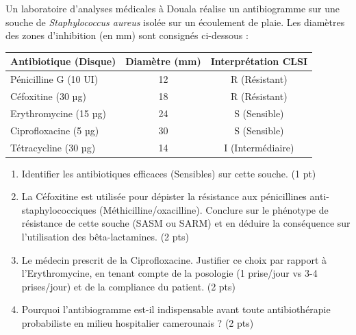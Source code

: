\documentclass[11pt]{article}
\begin{document}
\begin{exercice}
Un laboratoire d'analyses médicales à Douala réalise un antibiogramme sur une souche de \textit{Staphylococcus aureus} isolée sur un écoulement de plaie. Les diamètres des zones d'inhibition (en mm) sont consignés ci-dessous :

\begin{center}
\begin{tabular}{|l|c|c|}
\hline
\textbf{Antibiotique (Disque)} & \textbf{Diamètre (mm)} & \textbf{Interprétation CLSI} \\
\hline
Pénicilline G (10 UI) & 12 & R (Résistant) \\
\hline
Céfoxitine (30 µg) & 18 & R (Résistant) \\
\hline
Erythromycine (15 µg) & 24 & S (Sensible) \\
\hline
Ciprofloxacine (5 µg) & 30 & S (Sensible) \\
\hline
Tétracycline (30 µg) & 14 & I (Intermédiaire) \\
\hline
\end{tabular}
\end{center}

\begin{enumerate}
    \item Identifier les antibiotiques efficaces (Sensibles) sur cette souche. (1 pt)
    \item La Céfoxitine est utilisée pour dépister la résistance aux pénicillines anti-staphylococciques (Méthicilline/oxacilline). Conclure sur le phénotype de résistance de cette souche (SASM ou SARM) et en déduire la conséquence sur l'utilisation des bêta-lactamines. (2 pts)
    \item Le médecin prescrit de la Ciprofloxacine. Justifier ce choix par rapport à l'Erythromycine, en tenant compte de la posologie (1 prise/jour vs 3-4 prises/jour) et de la compliance du patient. (2 pts)
    \item Pourquoi l'antibiogramme est-il indispensable avant toute antibiothérapie probabiliste en milieu hospitalier camerounais ? (2 pts)
\end{enumerate}
\end{exercice}
\end{document}
